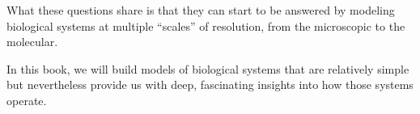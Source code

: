 What these questions share is that they can start to be answered by modeling biological systems at multiple “scales” of resolution, from the microscopic to the molecular.

In this book, we will build models of biological systems that are relatively simple but nevertheless provide us with deep, fascinating insights into how those systems operate.

\phantom{}\vspace{7.7\baselineskip}

\newpage

\tableofcontents*
\clearpage
{}

%
%
%
